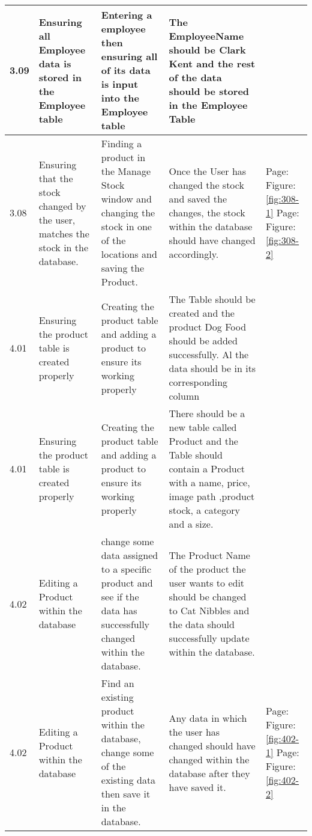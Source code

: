 \begin{flushleft}
\begin{longtable}{|p{1cm}|p{2.5cm}|p{2.5cm}|p{2cm}|p{2cm}|}
	\rowcolor{dark-grey}3.09 & Ensuring all Employee data is stored in the Employee table & Entering a employee then ensuring all of its data is input into the Employee table & The EmployeeName should be Clark Kent and the rest of the data should be stored in the Employee Table & \\ \hline
	\rowcolor{light-grey}3.08 & Ensuring that the stock changed by the user, matches the stock in the database. & Finding a product in the Manage Stock window and changing the stock in one of the locations and saving the Product. & Once the User has changed the stock and saved the changes, the stock within the database should have changed accordingly. & Page:\pageref{fig:308-1}  \newline Figure:\ref{fig:308-1} \newline \newline  Page:\pageref{fig:308-2}  \newline Figure:\ref{fig:308-2} \\ \hline
	\rowcolor{dark-grey}4.01 & Ensuring the product table is created properly & Creating the product table and adding a product to ensure its working properly & The Table should be created and the product Dog Food should be added successfully. Al the data should be in its corresponding column & \\ \hline
	\rowcolor{light-grey}4.01 & Ensuring the product table is created properly & Creating the product table and adding a product to ensure its working properly & There should be a new table called Product and the Table should contain a Product with a name, price, image path ,product stock, a category and a size.& \\ \hline
	\rowcolor{dark-grey}4.02 & Editing a Product within the database &  change some data assigned to a specific product and see if the data has successfully changed within the database. & The Product Name of the product the user wants to edit should be changed to Cat Nibbles and the data should successfully update within the database. & \\ \hline
	\rowcolor{light-grey}4.02 & Editing a Product within the database & Find an existing product within the database, change some of the existing data then save it in the database. & Any data in which the user has changed should have changed within the database after they have saved it. & Page:\pageref{fig:402-1}  \newline Figure:\ref{fig:402-1} \newline \newline  Page:\pageref{fig:402-2}  \newline Figure:\ref{fig:402-2} \\ \hline

\end{longtable}
\end{flushleft}
